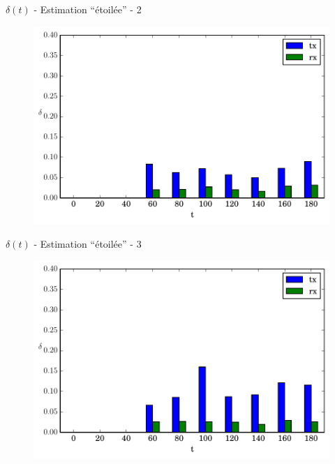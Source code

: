 \begin{frame}{$\delta(t)$ - Estimation ``étoilée'' - 2}
  \begin{figure}
    \centering  
    \includegraphics[width=\textwidth]{figures/evolution_noinfo_2.pdf}
  \end{figure}
\end{frame}

\begin{frame}{$\delta(t)$ - Estimation ``étoilée'' - 3}
  \begin{figure}
    \centering  
    \includegraphics[width=\textwidth]{figures/evolution_noinfo_3.pdf}
  \end{figure}
\end{frame}

